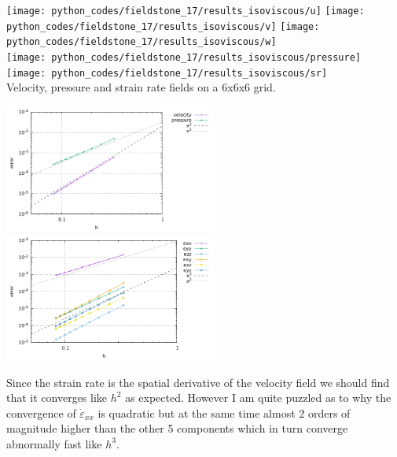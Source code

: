 \begin{center}
\texttt{[image: python\_codes/fieldstone\_17/results\_isoviscous/u]}
\texttt{[image: python\_codes/fieldstone\_17/results\_isoviscous/v]}
\texttt{[image: python\_codes/fieldstone\_17/results\_isoviscous/w]}\\
\texttt{[image: python\_codes/fieldstone\_17/results\_isoviscous/pressure]}
\texttt{[image: python\_codes/fieldstone\_17/results\_isoviscous/sr]}\\
{\captionfont Velocity, pressure and strain rate fields on a 6x6x6 grid.}
\end{center}

\begin{center}
\includegraphics[width=7cm]{python_codes/fieldstone_17/results_isoviscous/errors.pdf}
\includegraphics[width=7cm]{python_codes/fieldstone_17/results_isoviscous/errors_sr.pdf}
\end{center}
Since the strain rate is the spatial derivative of the velocity field we should 
find that it converges like $h^2$ as expected. However I am quite puzzled as to why the convergence 
of $\dot{\varepsilon}_{xx}$ is quadratic 
but at the same time almost 2 orders of magnitude higher than the other 5 components which in turn 
converge abnormally fast like $h^3$.

